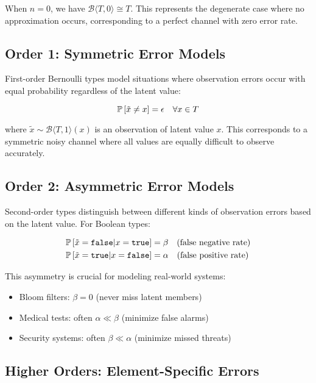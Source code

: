 \documentclass[11pt,final,hidelinks]{article}
\newcommand{\bernoulli}[2]{\mathcal{B}\langle #1, #2 \rangle}
\begin{document}
When $n = 0$, we have $\bernoulli{T}{0} \cong T$. This represents the degenerate case where no approximation occurs, corresponding to a perfect channel with zero error rate.

\subsection{Order 1: Symmetric Error Models}

First-order Bernoulli types model situations where observation errors occur with equal probability regardless of the latent value:

\begin{equation}
\mathbb{P}\left[\tilde{x} \neq x\right] = \epsilon \quad \forall x \in T
\end{equation}

where $\tilde{x} \sim \bernoulli{T}{1}(x)$ is an observation of latent value $x$. This corresponds to a symmetric noisy channel where all values are equally difficult to observe accurately.

\subsection{Order 2: Asymmetric Error Models}

Second-order types distinguish between different kinds of observation errors based on the latent value. For Boolean types:

\begin{align}
\mathbb{P}\left[\tilde{x} = \mathtt{false} | x = \mathtt{true}\right] &= \beta \quad \text{(false negative rate)} \\
\mathbb{P}\left[\tilde{x} = \mathtt{true} | x = \mathtt{false}\right] &= \alpha \quad \text{(false positive rate)}
\end{align}

This asymmetry is crucial for modeling real-world systems:
\begin{itemize}
    \item Bloom filters: $\beta = 0$ (never miss latent members)
    \item Medical tests: often $\alpha \ll \beta$ (minimize false alarms)
    \item Security systems: often $\beta \ll \alpha$ (minimize missed threats)
\end{itemize}

\subsection{Higher Orders: Element-Specific Errors}
\end{document}
